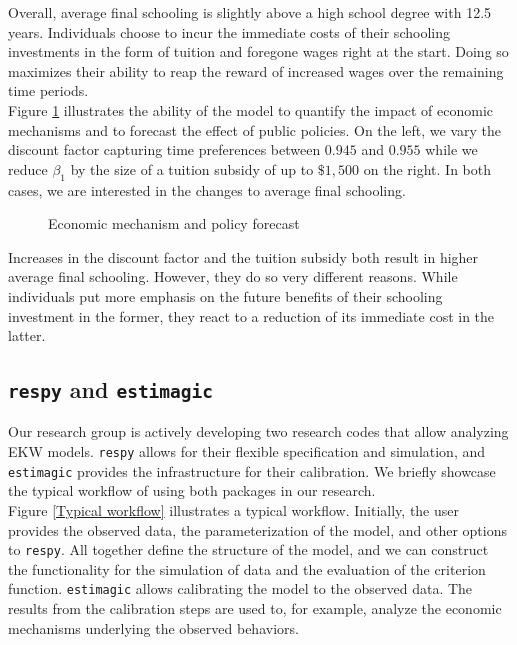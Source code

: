 \noindent Overall, average final schooling is slightly above a high school degree with 12.5 years. Individuals choose to incur the immediate costs of their schooling investments in the form of tuition and foregone wages right at the start. Doing so maximizes their ability to reap the reward of increased wages over the remaining time periods.\\

\noindent Figure \ref{Economic mechanism and policy forecast} illustrates the ability of the model to quantify the impact of economic mechanisms and to forecast the effect of public policies. On the left, we vary the discount factor capturing time preferences between $0.945$ and $0.955$ while we reduce $\beta_1$ by the size of a tuition subsidy of up to $\$1,500$ on the right. In both cases, we are interested in the changes to average final schooling.

\begin{figure}[h!]\centering
\caption{Economic mechanism and policy forecast}\label{Economic mechanism and policy forecast}
\hspace{0.3cm}
\end{figure}\FloatBarrier

\noindent Increases in the discount factor and the tuition subsidy both result in higher average final schooling. However, they do so very different reasons. While individuals put more emphasis on the future benefits of their schooling investment in the former, they react to a reduction of its immediate cost in the latter.
\subsection{\texttt{respy} and \texttt{estimagic}}
Our research group is actively developing two research codes that allow analyzing EKW models. \verb+respy+ allows for their flexible specification and simulation, and \verb+estimagic+ provides the infrastructure for their calibration. We briefly showcase the typical workflow of using both packages in our research.\\

\noindent Figure \ref{Typical workflow} illustrates a typical workflow. Initially, the user provides the observed data, the parameterization of the model, and other options to \verb+respy+. All together define the structure of the model, and we can construct the functionality for the simulation of data and the evaluation of the criterion function. \verb+estimagic+ allows calibrating the model to the observed data. The results from the calibration steps are used to, for example, analyze the economic mechanisms underlying the observed behaviors.

